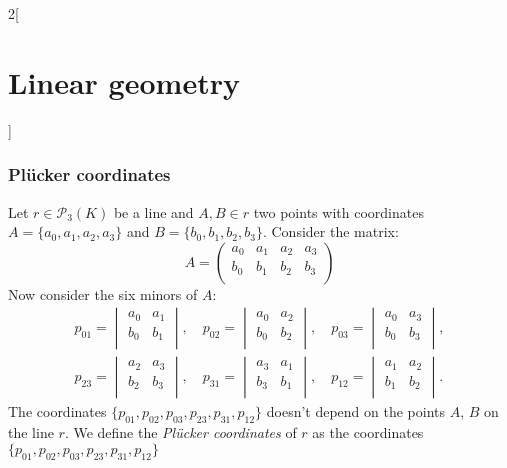 \documentclass[../../../main_math.tex]{subfiles}
\begin{document}
\begin{multicols}{2}[\section{Linear geometry}]
  \subsubsection{Plücker coordinates}
  \begin{proposition}
    Let $r\in\mathcal{P}_3(K)$ be a line and $A,B\in r$ two points with coordinates $A=\{a_0,a_1,a_2,a_3\}$ and $B=\{b_0,b_1,b_2,b_3\}$. Consider the matrix: $$A=\begin{pmatrix}
        a_0 & a_1 & a_2 & a_3 \\
        b_0 & b_1 & b_2 & b_3 \\
      \end{pmatrix}$$ Now consider the six minors of $A$:
    \begin{gather*}
      p_{01}=\begin{vmatrix}
        a_0 & a_1 \\
        b_0 & b_1 \\
      \end{vmatrix},\quad p_{02}=\begin{vmatrix}
        a_0 & a_2 \\
        b_0 & b_2 \\
      \end{vmatrix},\quad p_{03}=\begin{vmatrix}
        a_0 & a_3 \\
        b_0 & b_3 \\
      \end{vmatrix},\\ p_{23}=\begin{vmatrix}
        a_2 & a_3 \\
        b_2 & b_3 \\
      \end{vmatrix},\quad p_{31}=\begin{vmatrix}
        a_3 & a_1 \\
        b_3 & b_1 \\
      \end{vmatrix},\quad p_{12}=\begin{vmatrix}
        a_1 & a_2 \\
        b_1 & b_2 \\
      \end{vmatrix}.
    \end{gather*}
    The coordinates $\{p_{01},p_{02},p_{03},p_{23},p_{31},p_{12}\}$ doesn't depend on the points $A$, $B$ on the line $r$. We define the \emph{Plücker coordinates} of $r$ as the coordinates $\{p_{01},p_{02},p_{03},p_{23},p_{31},p_{12}\}$

\end{proposition}
\end{multicols}
\end{document}
